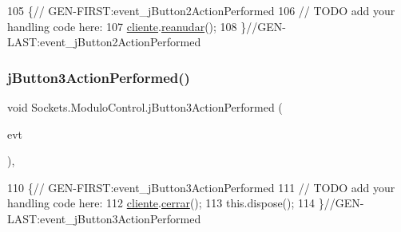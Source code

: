 \begin{DoxyCode}
105                                                                          \{\textcolor{comment}{//
      GEN-FIRST:event\_jButton2ActionPerformed}
106         \textcolor{comment}{// TODO add your handling code here:}
107         \mbox{\hyperlink{class_sockets_1_1_modulo_control_ae24879f5b211f987267a002a09329415}{cliente}}.\mbox{\hyperlink{class_sockets_1_1_cliente_ae2687fb804fba298cfa152bf078f6795}{reanudar}}();
108     \}\textcolor{comment}{//GEN-LAST:event\_jButton2ActionPerformed}
\end{DoxyCode}
\mbox{\label{class_sockets_1_1_modulo_control_a47a2f457c69a1633c1ba878b02220170}} 
\subsubsection{\texorpdfstring{j\+Button3\+Action\+Performed()}{jButton3ActionPerformed()}}
{\footnotesize\ttfamily void Sockets.\+Modulo\+Control.\+j\+Button3\+Action\+Performed (\begin{DoxyParamCaption}\item[{java.\+awt.\+event.\+Action\+Event}]{evt }\end{DoxyParamCaption})\hspace{0.3cm}{\ttfamily [inline]}, {\ttfamily [private]}}


\begin{DoxyCode}
110                                                                          \{\textcolor{comment}{//
      GEN-FIRST:event\_jButton3ActionPerformed}
111         \textcolor{comment}{// TODO add your handling code here:}
112         \mbox{\hyperlink{class_sockets_1_1_modulo_control_ae24879f5b211f987267a002a09329415}{cliente}}.\mbox{\hyperlink{class_sockets_1_1_cliente_a97cefc10f0737a0e35a923d895b24b30}{cerrar}}();
113         this.dispose();
114     \}\textcolor{comment}{//GEN-LAST:event\_jButton3ActionPerformed}
\end{DoxyCode}
\mbox{\label{class_sockets_1_1_modulo_control_ab4bba6507dcec16d872735788687efdf}} 
